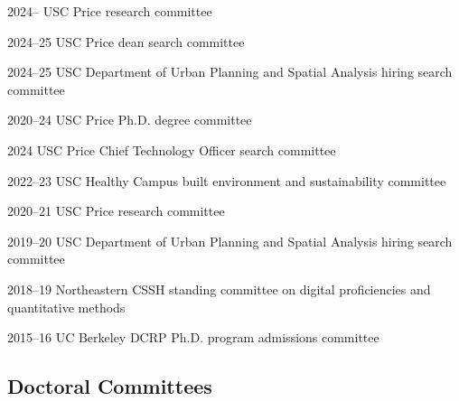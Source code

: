 \documentclass[11pt,letterpaper]{report} %
\begin{document}
    \begin{tablist}
        \item[2024--]   \tab{}USC Price research committee
        \item[2024--25] \tab{}USC Price dean search committee
        \item[2024--25] \tab{}USC Department of Urban Planning and Spatial Analysis hiring search committee
        \item[2020--24] \tab{}USC Price Ph.D. degree committee
        \item[2024]     \tab{}USC Price Chief Technology Officer search committee
        \item[2022--23] \tab{}USC Healthy Campus built environment and sustainability committee
        \item[2020--21] \tab{}USC Price research committee
        \item[2019--20] \tab{}USC Department of Urban Planning and Spatial Analysis hiring search committee
        \item[2018--19] \tab{}Northeastern CSSH standing committee on digital proficiencies and quantitative methods
        \item[2015--16] \tab{}UC Berkeley DCRP Ph.D. program admissions committee

    \end{tablist}

    \subsection*{Doctoral Committees}
\end{document}
